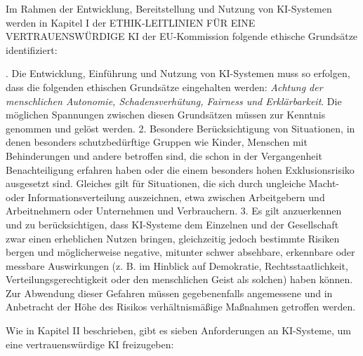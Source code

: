 \documentclass[12pt]{article}
\begin{document}
Im Rahmen der Entwicklung, Bereitstellung und Nutzung von KI-Systemen werden in Kapitel I der \glqq ETHIK-LEITLINIEN FÜR EINE VERTRAUENSWÜRDIGE KI\grqq{} der EU-Kommission folgende ethische Grundsätze identifiziert:

. Die Entwicklung, Einführung und Nutzung von KI-Systemen muss so erfolgen, dass die folgenden ethischen Grundsätze eingehalten werden: \textit{Achtung der menschlichen Autonomie, Schadensverhütung, Fairness und Erklärbarkeit}. Die möglichen Spannungen zwischen diesen Grundsätzen müssen zur Kenntnis genommen und gelöst werden. 
2. Besondere Berücksichtigung von Situationen, in denen besonders schutzbedürftige Gruppen wie Kinder, Menschen mit Behinderungen und andere betroffen sind, die schon in der Vergangenheit Benachteiligung erfahren haben oder die einem besonders hohen Exklusionsrisiko ausgesetzt sind. Gleiches gilt für Situationen, die sich durch ungleiche Macht- oder Informationsverteilung auszeichnen, etwa zwischen Arbeitgebern und Arbeitnehmern oder Unternehmen und Verbrauchern.
3. Es gilt anzuerkennen und zu berücksichtigen, dass KI-Systeme dem Einzelnen und der Gesellschaft zwar einen erheblichen Nutzen bringen, gleichzeitig jedoch bestimmte Risiken bergen und möglicherweise negative, mitunter schwer absehbare, erkennbare oder messbare Auswirkungen (z. B. im Hinblick auf Demokratie, Rechtsstaatlichkeit, Verteilungsgerechtigkeit oder den menschlichen Geist als solchen) haben können. Zur Abwendung dieser Gefahren müssen gegebenenfalls angemessene und in Anbetracht der Höhe des Risikos verhältnismäßige Maßnahmen getroffen werden.\grqq{}

Wie in Kapitel II beschrieben, gibt es sieben Anforderungen an KI-Systeme, um eine vertrauenswürdige KI freizugeben:
\end{document}
